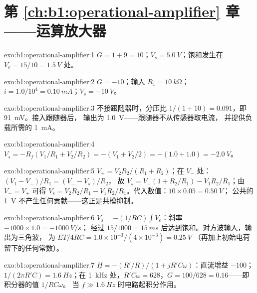 \section*{第 \ref{ch:b1:operational-amplifier} 章——运算放大器}

\begin{solution}{exo:b1:operational-amplifier:1}
$G = 1 + 9 = 10$；$V_s = \qty{5.0}{V}$；饱和发生在 $V_e = 15/10 =
\qty{1.5}{V}$ 处。
\end{solution}

\begin{solution}{exo:b1:operational-amplifier:2}
$G = -10$；输入 $R_1 = \qty{10}{k\ohm}$；$i = 1.0/10^4 =
\qty{0.10}{mA}$；$V_s = \qty{-10}{V}$。
\end{solution}

\begin{solution}{exo:b1:operational-amplifier:3}
不接跟随器时，分压比 $1/(1 + 10) = 0.091$，即 \qty{91}{mV}。接入跟随器后，
输出为 \qty{1.0}{V}——跟随器不从传感器取电流，
并提供负载所需的 \qty{1}{mA}。
\end{solution}

\begin{solution}{exo:b1:operational-amplifier:4}
$V_s = -R_f(V_1/R_1 + V_2/R_2) = -(V_1 + V_2/2) = -(1.0 + 1.0) = \qty{-2.0}{V}$。
\end{solution}

\begin{solution}{exo:b1:operational-amplifier:5}
$V_+ = V_2R_2/(R_1 + R_2)$；在 $V_-$ 处：$(V_1 - V_-)/R_1 = (V_- - V_s)/R_2$，
故 $V_s = V_-(1 + R_2/R_1) - V_1R_2/R_1$；由 $V_- = V_+$ 可得
$V_s = V_2R_2/R_1 - V_1R_2/R_1$。代入数值：$10 \times 0.05 = \qty{0.50}{V}$；
公共的 \qty{1}{V} 不产生任何贡献——这正是共模抑制。
\end{solution}

\begin{solution}{exo:b1:operational-amplifier:6}
$V_s = -(1/RC)\int V_e$：斜率 $-1000 \times 1.0 = \qty{-1000}{V/s}$；
经过 $15/1000 = \qty{15}{ms}$ 后达到饱和。对方波输入，输出为三角波，
为 $ET/4RC = 1.0 \times 10^{-3}/(4 \times 10^{-3}) = \qty{0.25}{V}$
（再加上初始电荷留下的任何常数）。
\end{solution}

\begin{solution}{exo:b1:operational-amplifier:7}
$\underline H = -(R'/R)/(1 + jR'C\omega)$：直流增益 $-100$；
$1/(2\pi R'C) = \qty{1.6}{Hz}$；在 \qty{1}{kHz} 处，$R'C\omega = 628$，$G =
100/628 = 0.16$——即积分器的值 $1/RC\omega$。
当 $f \gg \qty{1.6}{Hz}$ 时电路起积分作用。
\end{solution}

